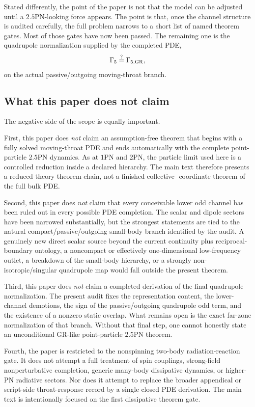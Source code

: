 \documentclass[11pt]{article}
\begin{document}
Stated differently, the point of the paper is not that the model can be adjusted
until a $2.5$PN-looking force appears.  The point is that, once the channel
structure is audited carefully, the full problem narrows to a short list of
named theorem gates.  Most of those gates have now been passed.  The remaining
one is the quadrupole normalization supplied by the completed PDE,
\[
\Gamma_5 \stackrel{?}{=} \Gamma_{5,{\rm GR}},
\]
on the actual passive/outgoing moving-throat branch.

\subsection{What this paper does not claim}
\label{sec:intro-nonclaims}

The negative side of the scope is equally important.

First, this paper does \emph{not} claim an assumption-free theorem that begins
with a fully solved moving-throat PDE and ends automatically with the complete
point-particle $2.5$PN dynamics.  As at $1$PN and $2$PN, the particle limit used
here is a controlled reduction inside a declared hierarchy.  The main text
therefore presents a reduced-theory theorem chain, not a finished collective-
coordinate theorem of the full bulk PDE.

Second, this paper does \emph{not} claim that every conceivable lower odd channel
has been ruled out in every possible PDE completion.  The scalar and dipole
sectors have been narrowed substantially, but the strongest statements are tied
to the natural compact/passive/outgoing small-body branch identified by the
audit.  A genuinely new direct scalar source beyond the current continuity plus
reciprocal-boundary ontology, a noncompact or effectively one-dimensional
low-frequency outlet, a breakdown of the small-body hierarchy, or a strongly
non-isotropic/singular quadrupole map would fall outside the present theorem.

Third, this paper does \emph{not} claim a completed derivation of the final
quadrupole normalization.  The present audit fixes the representation content,
the lower-channel demotions, the sign of the passive/outgoing quadrupole odd
term, and the existence of a nonzero static overlap.  What remains open is the
exact far-zone normalization of that branch.  Without that final step, one
cannot honestly state an unconditional GR-like point-particle $2.5$PN theorem.

Fourth, the paper is restricted to the nonspinning two-body radiation-reaction
gate.  It does not attempt a full treatment of spin couplings, strong-field
nonperturbative completion, generic many-body dissipative dynamics, or higher-PN
radiative sectors.  Nor does it attempt to replace the broader appendical or
script-side throat-response record by a single closed PDE derivation.  The main
text is intentionally focused on the first dissipative theorem gate.
\end{document}

